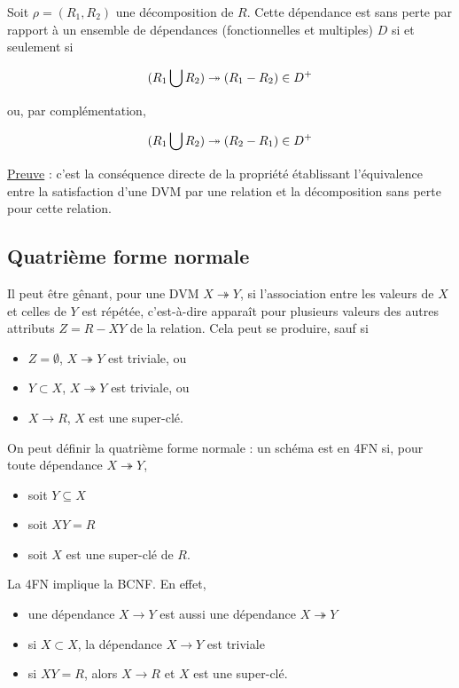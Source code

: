 		 Soit $\rho = (R_1, R_2)$ une décomposition de $R$. Cette dépendance est sans perte par rapport à un ensemble de dépendances (fonctionnelles et multiples) $D$ si et seulement si
		 
		 $$(R_1 \bigcup R_2) \twoheadrightarrow (R_1 - R_2) \in D^+$$
		 
		 ou, par complémentation,
		 
		 $$(R_1 \bigcup R_2) \twoheadrightarrow (R_2 - R_1) \in D^+$$
		 
		 \underline{Preuve} : c'est la conséquence directe de la propriété établissant l'équivalence entre la satisfaction d'une DVM par une relation et la décomposition sans perte pour cette relation.
		 
		 
		 \subsection{Quatrième forme normale}
		 
		 Il peut être gênant, pour une DVM $X \twoheadrightarrow Y$, si l'association entre les valeurs de $X$ et celles de $Y$ est répétée, c'est-à-dire apparaît pour plusieurs valeurs des autres attributs $Z = R - XY$ de la relation. Cela peut se produire, sauf si
		 
		 \begin{itemize}
		 	\item $Z = \emptyset$, $X \twoheadrightarrow Y$ est triviale, ou
		 	\item $Y \subset X$, $X \twoheadrightarrow Y$ est triviale, ou
		 	\item $X \rightarrow R$, $X$ est une super-clé.
		 \end{itemize}
		 
		 On peut définir la quatrième forme normale : un schéma est en 4FN si, pour toute dépendance $X \twoheadrightarrow Y$,
		 
		 \begin{itemize}
		 	\item soit $Y \subseteq X$
		 	\item soit $XY = R$
		 	\item soit $X$ est une super-clé de $R$.
		 \end{itemize}
		 
		 La 4FN implique la BCNF. En effet,
		 
		 \begin{itemize}
		 	\item une dépendance $X \rightarrow Y$ est aussi une dépendance $X \twoheadrightarrow Y$
		 	\item si $X \subset X$, la dépendance $X \rightarrow Y$ est triviale
		 	\item si $XY = R$, alors $X \rightarrow R$ et $X$ est une super-clé.
		 \end{itemize}
		 
